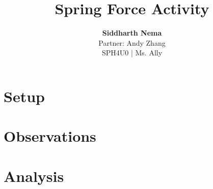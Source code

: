 \documentclass[12pt,letterpaper]{article}
\title{\textbf{Spring Force Activity}}
\author{\textbf{Siddharth Nema} \\Partner: Andy Zhang \\SPH4U0 | Ms.\hspace{-1mm} Ally}
\begin{document}
\maketitle
\newpage
\section{Setup}


\section{Observations}

\newpage

\section{Analysis}
\vspace{-4mm}


\end{document}
